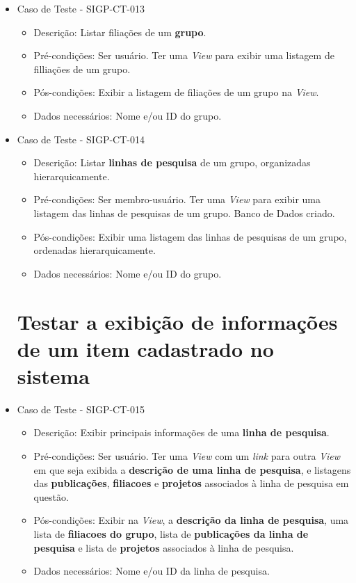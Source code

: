 \documentclass[11pt, a4paper]{book}
\begin{document}
\begin{itemize}
	\item Caso de Teste - SIGP-CT-013
	\begin{itemize}
	\item Descrição: Listar filiações de um \textbf{grupo}.
	\item Pré-condições: Ser usuário. Ter uma \emph{View} para exibir uma listagem de filliações de um grupo.
	\item Pós-condições: Exibir a listagem de filiações de um grupo na \emph{View}.
	\item Dados necessários: Nome  e/ou ID do grupo.
	\end{itemize}

	\item Caso de Teste - SIGP-CT-014
	\begin{itemize}
	\item Descrição: Listar \textbf{linhas de pesquisa} de um grupo, organizadas hierarquicamente.
	\item Pré-condições: Ser membro-usuário. Ter uma \emph{View} para exibir uma listagem das linhas de pesquisas de um grupo. Banco de Dados criado.
	\item Pós-condições: Exibir uma listagem das linhas de pesquisas de um grupo, ordenadas hierarquicamente.
	\item Dados necessários: Nome e/ou ID do grupo. 
	\end{itemize}


\newpage
\section{Testar a exibição de informações de um item cadastrado no sistema}

	\item Caso de Teste - SIGP-CT-015
	\begin{itemize}
	\item Descrição: Exibir principais informações de uma \textbf{linha de pesquisa}.
	\item Pré-condições: Ser usuário. Ter uma \emph{View} com um \emph{link} para outra \emph{View} em que seja exibida a \textbf{descrição de uma linha de pesquisa}, e listagens das \textbf{publicações}, \textbf{filiacoes} e \textbf{projetos} associados à linha de pesquisa em questão.
	\item Pós-condições: Exibir na \emph{View}, a \textbf{descrição da linha de pesquisa}, uma lista de \textbf{filiacoes do grupo}, lista de \textbf{publicações da linha de pesquisa} e lista de \textbf{projetos} associados à linha de pesquisa.
	\item Dados necessários: Nome e/ou ID da linha de pesquisa.
	\end{itemize}


\end{itemize}
\end{document}

